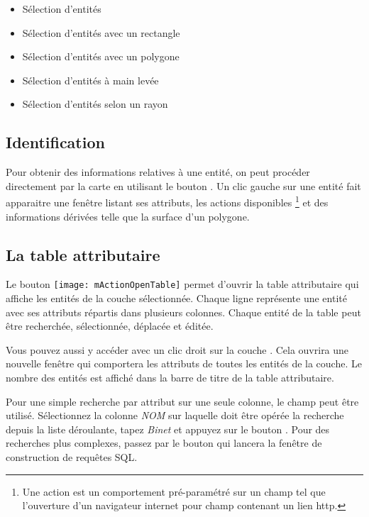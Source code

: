\begin{itemize}
\item Sélection d'entités
\item Sélection d'entités avec un rectangle
\item Sélection d'entités avec un polygone
\item Sélection d'entités à main levée
\item Sélection d'entités selon un rayon
\end{itemize}
               
\subsection{Identification}

Pour obtenir des informations relatives à une entité, on peut procéder directement par la carte en utilisant le bouton . Un clic gauche sur une entité fait apparaitre une fenêtre listant ses attributs, les actions disponibles \footnote{Une action est un comportement pré-paramétré sur un champ tel que l'ouverture d'un navigateur internet pour champ contenant un lien http.} et des informations dérivées telle que la surface d'un polygone.


\subsection{La table attributaire}

Le bouton \texttt{[image: mActionOpenTable]} permet d'ouvrir la table attributaire qui affiche les entités de la couche sélectionnée. Chaque ligne représente une entité avec ses attributs répartis dans  plusieurs colonnes. Chaque entité de la table peut être recherchée, sélectionnée, déplacée et éditée.

Vous pouvez aussi y accéder avec un clic droit sur la couche . Cela ouvrira une nouvelle fenêtre qui comportera les attributs de toutes les entités de la couche. Le nombre des entités est affiché dans la barre de titre de la table attributaire.

Pour une simple recherche par attribut sur une seule colonne, le champ  peut être utilisé. Sélectionnez la colonne \textit{NOM} sur laquelle doit être opérée la recherche depuis la liste déroulante, tapez \textit{Binet} et appuyez sur le bouton . Pour des recherches plus complexes, passez par le bouton  qui lancera la fenêtre de construction de requêtes SQL.

